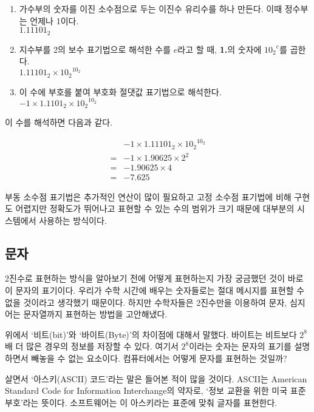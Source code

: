 \documentclass{article}
\begin{document}
\begin{enumerate}
    \item 가수부의 숫자를 이진 소수점으로 두는 이진수 유리수를 하나 만든다. 이때 정수부는 언제나 1이다. \\
          $1.11101_2$
    \item 지수부를 2의 보수 표기법으로 해석한 수를 $e$라고 할 때, \textbf{1.}의 숫자에 ${10_2}^e$를 곱한다. \\
          $1.11101_2 \times {10_2}^{10_2}$
    \item 이 수에 부호를 붙여 부호화 절댓값 표기법으로 해석한다. \\
          $-1 \times 1.1101_2 \times {10_2}^{10_2}$
\end{enumerate}

이 수를 해석하면 다음과 같다.

$$
\begin{aligned}
     & -1 \times 1.11101_2 \times {10_2}^{10_2} \\
    =& -1 \times 1.90625 \times 2^2 \\
    =& -1.90625 \times 4 \\
    =& -7.625
\end{aligned}
$$

부동 소수점 표기법은 추가적인 연산이 많이 필요하고 고정 소수점 표기법에 비해 구현도 어렵지만
정확도가 뛰어나고 표현할 수 있는 수의 범위가 크기 때문에
대부분의 시스템에서 사용하는 방식이다.

\subsection{문자}

2진수로 표현하는 방식을 알아보기 전에 어떻게 표현하는지 가장 궁금했던 것이 바로 이 문자의
표기이다. 우리가 수학 시간에 배우는 숫자들로는 절대 메시지를 표현할 수 없을 것이라고 생각했기
때문이다. 하지만 수학자들은 2진수만을 이용하여 문자, 심지어는 문자열까지 표현하는 방법을
고안해냈다.

위에서 `비트(bit)'와 `바이트(Byte)'의 차이점에 대해서 말했다. 바이트는 비트보다 $2^8$배 더
많은 경우의 정보를 저장할 수 있다. 여기서 $2^8$이라는 숫자는 문자의 표기를 설명하면서 빼놓을
수 없는 요소이다. 컴퓨터에서는 어떻게 문자를 표현하는 것일까?

살면서 `아스키(ASCII) 코드'라는 말은 들어본 적이 많을 것이다. ASCII는 American Standard
Code for Information Interchange의 약자로, `정보 교환을 위한 미국 표준 부호'라는 뜻이다.
소프트웨어는 이 아스키라는 표준에 맞춰 글자를 표현한다.
\end{document}
